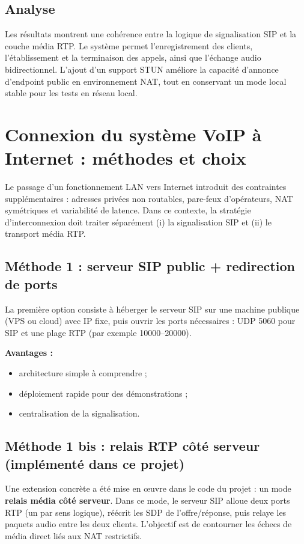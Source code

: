 \documentclass[12pt,a4paper]{article}
\begin{document}
\subsection{Analyse}

Les résultats montrent une cohérence entre la logique de signalisation SIP et la couche média RTP. Le système permet l'enregistrement des clients, l'établissement et la terminaison des appels, ainsi que l'échange audio bidirectionnel. L'ajout d'un support STUN améliore la capacité d'annonce d'endpoint public en environnement NAT, tout en conservant un mode local stable pour les tests en réseau local.

\section{Connexion du système VoIP à Internet : méthodes et choix}

Le passage d'un fonctionnement LAN vers Internet introduit des contraintes supplémentaires : adresses privées non routables, pare-feux d'opérateurs, NAT symétriques et variabilité de latence. Dans ce contexte, la stratégie d'interconnexion doit traiter séparément (i) la signalisation SIP et (ii) le transport média RTP.

\subsection{Méthode 1 : serveur SIP public + redirection de ports}

La première option consiste à héberger le serveur SIP sur une machine publique (VPS ou cloud) avec IP fixe, puis ouvrir les ports nécessaires : UDP 5060 pour SIP et une plage RTP (par exemple 10000--20000).

	\textbf{Avantages :}
\begin{itemize}[leftmargin=1.2cm]
    \item architecture simple à comprendre ;
    \item déploiement rapide pour des démonstrations ;
    \item centralisation de la signalisation.
\end{itemize}

\subsection{Méthode 1 bis : relais RTP côté serveur (implémenté dans ce projet)}

Une extension concrète a été mise en œuvre dans le code du projet : un mode \textbf{relais média côté serveur}. Dans ce mode, le serveur SIP alloue deux ports RTP (un par sens logique), réécrit les SDP de l'offre/réponse, puis relaye les paquets audio entre les deux clients. L'objectif est de contourner les échecs de média direct liés aux NAT restrictifs.
\end{document}

